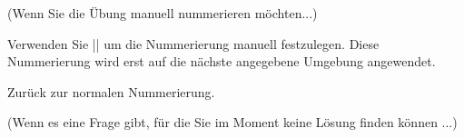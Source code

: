 \documentclass[11pt,
  logo = {example-image},
  title in boldface,
  theorem in new line,
  colored solution,
]{homework}
\begin{document}
\bigskip\textcolor{gray!55}{(Wenn Sie die Übung manuell nummerieren möchten...)}

\begin{exercise}
    Verwenden Sie \cverb|\ManualNumbering| um die Nummerierung manuell festzulegen. Diese Nummerierung wird erst auf die nächste angegebene Umgebung angewendet.
\end{exercise}

\begin{exercise}
    Zurück zur normalen Nummerierung.
\end{exercise}


\bigskip\textcolor{gray!55}{(Wenn es eine Frage gibt, für die Sie im Moment keine Lösung finden können ...)}

\end{document}
